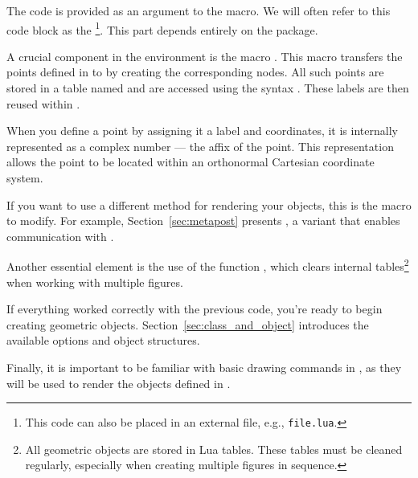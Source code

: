The  code is provided as an argument to the  macro. We will often refer to this code block as the  \footnote{This code can also be placed in an external file, e.g., \texttt{file.lua}.}. This part depends entirely on the  package.

A crucial component in the  environment is the macro . This macro transfers the points defined in  to \tkzNamePack{\TIKZ} by creating the corresponding nodes. All such points are stored in a table named  and are accessed using the syntax . These labels are then reused within .

When you define a point by assigning it a label and coordinates, it is internally represented as a complex number — the affix of the point. This representation allows the point to be located within an orthonormal Cartesian coordinate system.

If you want to use a different method for rendering your objects, this is the macro to modify. For example, Section~\ref{sec:metapost} presents , a variant that enables communication with .

Another essential element is the use of the function , which clears internal tables\footnote{All geometric objects are stored in Lua tables. These tables must be cleaned regularly, especially when creating multiple figures in sequence.} when working with multiple figures.

If everything worked correctly with the previous code, you're ready to begin creating geometric objects. Section~\ref{sec:class_and_object} introduces the available options and object structures.

Finally, it is important to be familiar with basic drawing commands in , as they will be used to render the objects defined in .
\endinput